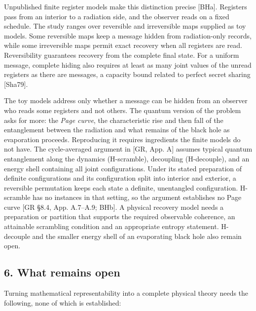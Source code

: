 \documentclass[
]{article}
\begin{document}
Unpublished finite register models make this distinction precise
{[}BHa{]}. Registers pass from an interior to a radiation side, and the
observer reads on a fixed schedule. The study ranges over reversible and
irreversible maps supplied as toy models. Some reversible maps keep a
message hidden from radiation-only records, while some irreversible maps
permit exact recovery when all registers are read. Reversibility
guarantees recovery from the complete final state. For a uniform
message, complete hiding also requires at least as many joint values of
the unread registers as there are messages, a capacity bound related to
perfect secret sharing {[}Sha79{]}.

The toy models address only whether a message can be hidden from an
observer who reads some registers and not others. The quantum version of
the problem asks for more: the \emph{Page curve}, the characteristic
rise and then fall of the entanglement between the radiation and what
remains of the black hole as evaporation proceeds. Reproducing it
requires ingredients the finite models do not have. The cycle-averaged
argument in {[}GR, App. A{]} assumes typical quantum entanglement along
the dynamics (H-scramble), decoupling (H-decouple), and an energy shell
containing all joint configurations. Under its stated preparation of
definite configurations and its configuration split into interior and
exterior, a reversible permutation keeps each state a definite,
unentangled configuration. H-scramble has no instances in that setting,
so the argument establishes no Page curve {[}GR §8.4, App. A.7--A.9;
BHb{]}. A physical recovery model needs a preparation or partition that
supports the required observable coherence, an attainable scrambling
condition and an appropriate entropy statement. H-decouple and the
smaller energy shell of an evaporating black hole also remain open.

\hypertarget{what-remains-open}{%
\subsection{6. What remains open}\label{what-remains-open}}

Turning mathematical representability into a complete physical theory
needs the following, none of which is established:
\end{document}
